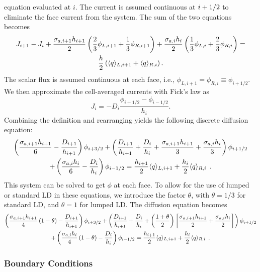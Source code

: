 equation evaluated at $i$.  The current is assumed continuous at ${i+1/2}$ to eliminate
the face current from the system.  The sum of the two equations becomes
\begin{multline}
    J_{i+1} - J_{i} + \frac{\sigma_{a,i+1} h_{i+1}}{2}\left(\frac{2}{3} \phi_{L,i+1} +
    \frac{1}{3}\phi_{R,i+1}\right) + \frac{\sigma_{a,i} h_i}{2} \left( \frac{1}{3} \phi_{L,i} +
    \frac{2}{3}\phi_{R,i}\right) =\\ \frac{h}{2} \left(\langle q \rangle_{L,i+1} + \langle q \rangle_{R,i}
    \right).
\end{multline}
The scalar flux is assumed continuous at each face, i.e., $\phi_{L,i+1} = \phi_{R,i}
\equiv \phi_{i+1/2}$.  We then approximate the cell-averaged currents with Fick's law
as \begin{equation}\label{eq:ficks}
    J_{i} = -D_i \frac{\phi_{i+1/2} - \phi_{i-1/2}}{h_i}.
\end{equation}
Combining the definition and rearranging yields the following discrete diffusion
equation:
\begin{multline}
        \left(\frac{\sigma_{a,i+1} h_{i+1}}{6} -
        \frac{D_{i+1}}{h_{i+1}}\right)\phi_{i+3/2} + \left(\frac{D_{i+1}}{h_{i+1}} +
        \frac{D_{i}}{h_i} + \frac{\sigma_{a,i+1} h_{i+1}}{3} + \frac{\sigma_{a,i}
        h_{i}}{3}\right)\phi_{i+1/2} \\ + \left(\frac{\sigma_{a,i} h_{i}}{6} -
        \frac{D_{i}}{h_{i}}\right)\phi_{i-1/2} = \frac{h_{i+1}}{2} \langle q \rangle_{L,i+1} +
        \frac{h_{i}}{2}\langle q \rangle_{R,i}\;\,. 
\end{multline}
This system can be solved to get $\phi$ at each face.  To allow for the use of lumped
or standard LD in these equations, we introduce the factor $\theta$, with
$\theta=1/3$ for standard
LD, and $\theta=1$ for lumped LD.  The diffusion equation becomes
\begin{multline}
    \left(\frac{\sigma_{a,i+1} h_{i+1}}{4}\left(1 - \theta\right)  -
        \frac{D_{i+1}}{h_{i+1}}\right)\phi_{i+3/2} + \left(\frac{D_{i+1}}{h_{i+1}} +
        \frac{D_{i}}{h_i} + \left(\frac{1+\theta}{2} \right)\left[\frac{\sigma_{a,i+1} h_{i+1}}{2} + \frac{\sigma_{a,i}
        h_{i}}{2}\right]\right)\phi_{i+1/2} \\ + \left(\frac{\sigma_{a,i}
        h_{i}}{4}\left(1 - \theta\right) -
        \frac{D_{i}}{h_{i}}\right)\phi_{i-1/2} = \frac{h_{i+1}}{2} \langle q \rangle_{L,i+1} +
        \frac{h_{i}}{2}\langle q \rangle_{R,i}
        \;\,. 
\end{multline}

\subsubsection{Boundary Conditions}

